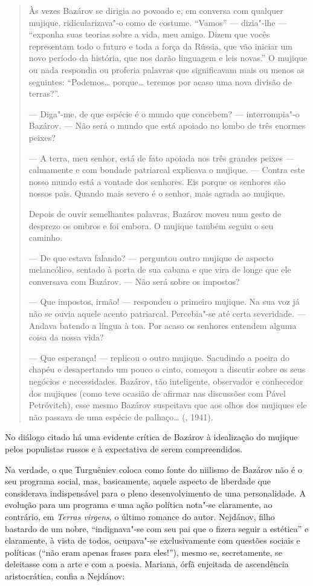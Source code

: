 \begin{quotation}
Às vezes Bazárov se dirigia ao povoado e, em conversa com qualquer mujique, ridicularizava"-o como de costume. ``Vamos'' --- dizia"-lhe --- ``exponha suas teorias sobre a vida, meu amigo. Dizem que vocês representam todo o futuro e toda a força da Rússia, que vão iniciar um novo período da história, que nos darão linguagem e leis novas.'' O mujique ou nada respondia ou proferia palavras que significavam mais ou menos as seguintes: ``Podemos\ldots{} porque\ldots{} teremos por acaso uma nova divisão
de terras?''.

--- Diga"-me, de que espécie é o mundo que concebem? ---
interrompia"-o Bazárov. --- Não será o mundo que está apoiado no
lombo de três enormes peixes?

--- A terra, meu senhor, está de fato apoiada nos três grandes peixes --- calmamente e com bondade patriarcal explicava o mujique. --- Contra este nosso mundo está a vontade dos senhores. Eis porque os senhores são nossos pais. Quando mais severo é o senhor, mais agrada ao mujique.

Depois de ouvir semelhantes palavras, Bazárov moveu num gesto de
desprezo os ombros e foi embora. O mujique também seguiu o seu caminho.

--- De que estava falando? --- perguntou outro mujique de aspecto melancólico, sentado à porta de sua cabana e que vira de longe
que ele conversava com Bazárov. --- Não será sobre os impostos?

--- Que impostos, irmão! --- respondeu o primeiro mujique. Na sua voz já não se ouvia aquele acento patriarcal. Percebia"-se até certa severidade. --- Andava batendo a língua à toa. Por acaso os senhores entendem alguma coisa da nossa vida?

--- Que esperança! --- replicou o outro mujique. Sacudindo a poeira do chapéu e desapertando um pouco o cinto, começou a discutir sobre os seus negócios e necessidades. Bazárov, tão inteligente, observador e conhecedor dos mujiques (como teve ocasião de afirmar nas discussões com Pável Petróvitch), esse mesmo Bazárov suspeitava que aos olhos dos mujiques ele não passava de uma espécie de palhaço\ldots{} (, 1941).
\end{quotation}

No diálogo citado há uma evidente crítica de Bazárov à idealização do
mujique pelos populistas russos e à expectativa de serem compreendidos.

Na verdade, o que Turguêniev coloca como fonte do niilismo de
Bazárov não é o seu programa social, mas, basicamente, aquele aspecto
de liberdade que considerava indispensável para o pleno desenvolvimento
de uma personalidade. A evolução para um programa e uma ação política
nota"-se claramente, ao contrário, em \emph{Terras virgens}, o último
romance do autor. Nejdánov, filho bastardo de um nobre, ``indignava"-se
com seu pai que o fizera seguir a estética'' e claramente, à vista de
todos, ocupava"-se exclusivamente com questões sociais e políticas (``não
eram apenas frases para eles!''), mesmo se, secretamente, se deleitasse
com a arte e com a poesia. Mariana, órfã enjeitada de ascendência
aristocrática, confia a Nejdánov:

